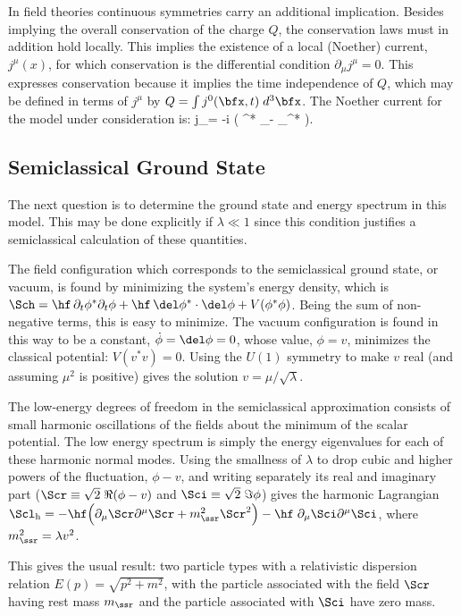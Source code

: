 In field theories continuous symmetries carry an additional implication.
Besides implying the overall conservation of the charge $Q$, the
conservation laws must in addition hold locally. This implies 
the existence of a local (Noether) current, $j^\mu(x)$, 
for which conservation is the differential condition $\partial_\mu 
j^\mu = 0$. This expresses conservation because it implies the 
time independence of $Q$, which may be defined in terms of 
$j^\mu$ by $Q = \int j^0(\bfx,t) \; d^3\bfx$.
The Noether current for the model under consideration is:
%
\eq
\label{toync}
j_\mu = -i \left( \phi^* \partial_\mu \phi - \phi \partial_\mu \phi^* \right).
\eeq

\subsection{Semiclassical Ground State}

The next question is to determine the ground state and energy spectrum
in this model. This may be done explicitly if $\lambda \ll 1$ since
this condition justifies a semiclassical calculation of these quantities.

The field configuration which corresponds to the semiclassical 
ground state, or vacuum, is found by minimizing the system's 
energy density, which is $\Sch = \hf \, \partial_t{\phi}^* 
\partial_t{\phi} + \hf \, \del\phi^* \cdot \del\phi + V(\phi^*\phi)$. 
Being the sum of non-negative terms, this is easy to minimize. 
The vacuum configuration is found in this way to be a constant, 
$\dot\phi = \del\phi = 0$, whose value, $\phi = v$, minimizes the classical
potential: $V(v^*v) = 0$. Using the $U(1)$ symmetry to make 
$v$ real (and assuming $\mu^2$ is positive) gives the solution
$v = \mu /\sqrt{\lambda}$. 

The low-energy degrees of freedom in the semiclassical approximation 
consists of small harmonic oscillations of the fields about the minimum
of the scalar potential. The low energy spectrum is simply the
energy eigenvalues for each of these harmonic normal modes. 
Using the smallness of $\lambda$ to drop cubic and higher powers
of the fluctuation, $\phi - v$, and writing separately its real and 
imaginary part ($\Scr \equiv \sqrt{2} \; \Re (\phi - v)$ and 
$\Sci \equiv \sqrt{2} \; \Im \phi$) gives the harmonic 
Lagrangian $\Scl_{\rm h} =
-\hf \Bigl( \partial_\mu \Scr \partial^\mu \Scr + m_\ssr^2 \Scr^2 \Bigr)
-\hf  \; \partial_\mu \Sci \partial^\mu \Sci $, where $m_\ssr^2 
= \lambda v^2$. 

This gives the usual result: two particle types with a relativistic 
dispersion relation $E(p) = \sqrt{p^2 + m^2}$, with the particle
associated with the field $\Scr$ having rest mass $m_\ssr$ and
the particle associated with $\Sci$ have zero mass. 

